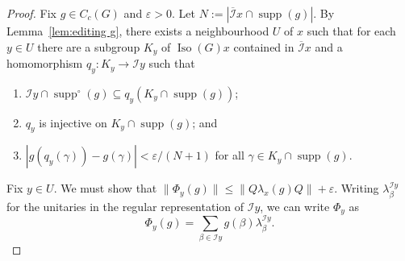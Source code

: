 \documentclass[a4paper, 12pt]{amsart}
\theoremstyle{plain}
\theoremstyle{definition}
\theoremstyle{remark}
\newcommand{\Iso}{\operatorname{Iso}}
\newcommand{\supp}{\operatorname{supp}}
\newcommand{\Ii}{\mathcal{I}}
\newcommand{\Iicl}{\overline{\mathcal{I}}}
\numberwithin{equation}{section}
\begin{document}
\begin{proof}
Fix $g \in C_c(G)$ and $\varepsilon > 0$. Let $N := |\Iicl x \cap \supp(g)|$.
By Lemma~\ref{lem:editing g}, there exists a neighbourhood $U$ of $x$ such
that for each $y \in U$ there are a subgroup $K_y$ of $\Iso(G) x$ contained
in $\Iicl x$ and a homomorphism $q_y \colon K_y \to \Ii y$ such that
\begin{enumerate}[label=\textup{(\alph*)}]
\item\label{it:lem editing g:subset,specific} $\Ii y \cap \supp^\circ (g) \subseteq q_y(K_y \cap
    \supp(g))$;
\item\label{it:lem editing g:injective,specific} $q_y$ is injective on $K_y \cap \supp(g)$; and
\item\label{it:lem editing g:epsilon,specific}  $|g(q_y(\gamma)) - g(\gamma)| < \varepsilon/(N+1)$ for all $\gamma
    \in K_y \cap \supp(g)$.
\end{enumerate}

Fix $y \in U$. We must show that $\|\Phi_y(g)\| \le \|Q \lambda_x(g) Q\| +
\varepsilon$. Writing $\lambda^{\Ii y}_{\beta}$ for the unitaries in the regular representation of $\Ii y$, we can write $\Phi_y$  as
\[
 \Phi_y(g)
    = \sum_{\beta  \in \Ii y} g(\beta )\lambda^{\Ii y}_\beta.
\]


\end{proof}
\end{document}
